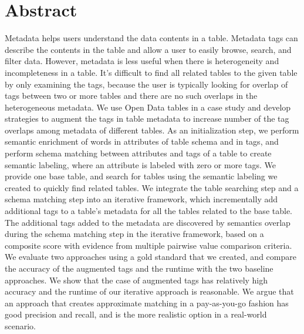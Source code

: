 
\chapter{Abstract}
Metadata helps users understand the data contents in a table. Metadata tags can describe the contents in the table and allow a user to easily browse, search, and filter data. However, metadata is less useful when there is heterogeneity and incompleteness in a table. It's difficult to find all related tables to the given table by only examining the tags, because the user is typically looking for overlap of tags between two or more tables and there are no such overlaps in the heterogeneous metadata. We use Open Data tables in a case study and develop strategies to augment the tags in table metadata to increase number of the tag overlaps among metadata of different tables. As an initialization step, we perform semantic enrichment of words in attributes of table schema and in tags, and perform schema matching between attributes and tags of a table to create semantic labeling, where an attribute is labeled with zero or more tags. We provide one base table, and search for tables using the semantic labeling we created to quickly find related tables. We integrate the table searching step and a schema matching step into an iterative framework, which incrementally add additional tags to a table’s metadata for all the tables related to the base table. The additional tags added to the metadata are discovered by semantics overlap during the schema matching step in the iterative framework, based on a composite score with evidence from multiple pairwise value comparison criteria. We evaluate two approaches using a gold standard that we created, and compare the accuracy of the augmented tags and the runtime with the two baseline approaches. We show that the case of augmented tags has relatively high accuracy and the runtime of our iterative approach is reasonable. We argue that an approach that creates approximate matching in a pay-as-you-go fashion has good precision and recall, and is the more realistic option in a real-world scenario.
\endinput